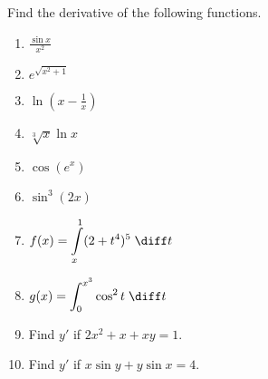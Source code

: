 
Find the derivative of the following functions.
\begin{multicols}{2}
\begin{enumerate}
\item ${\displaystyle \frac{\sin x}{x^2}}$

\item ${\displaystyle e^{\sqrt{x^2 + 1}}}$

\item ${\displaystyle \ln \left(x-\frac{1}{x} \right)}$

\item ${\displaystyle \sqrt[3]{x} \ln x}$

\item ${\displaystyle \cos(e^x)}$

\item ${\displaystyle \sin^3(2x)}$

\item\label{problemDifferentiateFTC1int_x^1(2+t^4)^5dt}  ${\displaystyle f(x) = \int\limits_x^1 (2+t^4)^5 \; \diff t}$

\item ${\displaystyle g(x) = \int_{0}^{x^3} \cos^2 t \; \diff t}$

\item Find $y'$ if $2x^2 + x + xy = 1$.

\item Find $y'$ if $x \sin y + y \sin x = 4$.

\end{enumerate}
\end{multicols}
